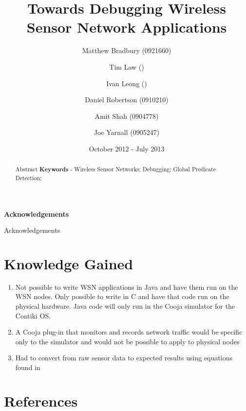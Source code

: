 \documentclass[a4paper]{article}
\title{Towards Debugging Wireless Sensor Network Applications}
\date{October 2012 - July 2013}
\author{
	Matthew Bradbury (0921660) \and
	Tim Law () \and
	Ivan Leong () \and
	Daniel Robertson (0910210) \and
	Amit Shah (0904778) \and
	Joe Yarnall (0905247)
}
\makeatletter
\newcommand\ackname{Acknowledgements}
\newenvironment{acknowledgements}{%
      \titlepage
      \null\vfil
      \@beginparpenalty\@lowpenalty
      \begin{center}%
        \bfseries \ackname
        \@endparpenalty\@M
      \end{center}}%
     {\par\vfil\null\endtitlepage}
\newenvironment{acknowledgements}{%
      \if@twocolumn
        \section*{\abstractname}%
      \else
        \small
        \begin{center}%
          {\bfseries \ackname\vspace{-.5em}\vspace{\z@}}%
        \end{center}%
        \quotation
      \fi}
      {\if@twocolumn\else\endquotation\fi}
\makeatother
\begin{document}
\maketitle

\pagestyle{empty}
\thispagestyle{empty}

\newpage

\begin{abstract}
Abstract
\newline
\newline
\noindent \textbf{Keywords} - Wireless Sensor Networks; Debugging; Global Predicate Detection;
\end{abstract}
\newpage

\begin{acknowledgements}
Acknowledgements
\end{acknowledgements}
\newpage


\pagestyle{plain}
\setcounter{page}{1}

\tableofcontents
\clearpage




\clearpage


\section{Knowledge Gained}
\begin{enumerate}
	\item Not possible to write WSN applications in Java and have them run on the WSN nodes. Only possible to write in C and have that code run on the physical hardware. Java code will only run in the Cooja simulator for the Contiki OS.
	\item A Cooja plug-in that monitors and records network traffic would be specific only to the simulator and would not be possible to apply to physical nodes
	\item Had to convert from raw sensor data to expected results using equations found in \cite{sensiriondatasheet}
\end{enumerate}
\clearpage




\clearpage



\clearpage

\appendixpage
\addappheadtotoc
\appendix



\newpage

\section{References}
\renewcommand{\refname}{\vspace{-1cm}}


\end{document}
